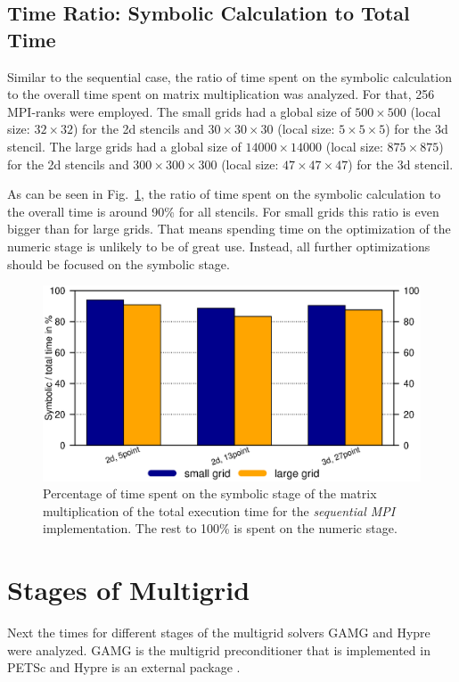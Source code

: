 \subsection{Time Ratio: Symbolic Calculation to Total Time}
Similar to the sequential case, the ratio of time spent on the symbolic calculation to the overall time spent on matrix multiplication was analyzed. For that, 256 MPI-ranks were employed. The small grids had a global size of $500\times 500$ (local size: $32\times 32$) for the 2d stencils and $30\times 30 \times 30$ (local size: $5\times 5 \times 5$) for the 3d stencil. The large grids had a global size of $14000\times 14000$ (local size: $875 \times 875$) for the 2d stencils and $300 \times 300 \times 300$ (local size: $47\times 47 \times 47$) for the 3d stencil. 

As can be seen in Fig.~\ref{fig:mpi_symnum}, the ratio of time spent on the symbolic calculation to the overall time is around 90\% for all stencils. For small grids this ratio is even bigger than for large grids. That means spending time on the optimization of the numeric stage is unlikely to be of great use. Instead, all further optimizations should be focused on the symbolic stage. 

\begin{figure}[tbp]
	\centering
	\includegraphics[width=1\textwidth, trim={0 3.cm 0 7cm},clip]{mpi_symnum}
	\caption{Percentage of time spent on the symbolic stage of the matrix multiplication of the total execution time for the \textit{sequential MPI} implementation. The rest to 100\% is spent on the numeric stage.} 
	\label{fig:mpi_symnum}
\end{figure}

\section{Stages of Multigrid}
Next the times for different stages of the multigrid solvers GAMG and Hypre were analyzed. 
GAMG is the multigrid preconditioner that is implemented in PETSc and Hypre is an external package \cite{hypre-web-page}. 

